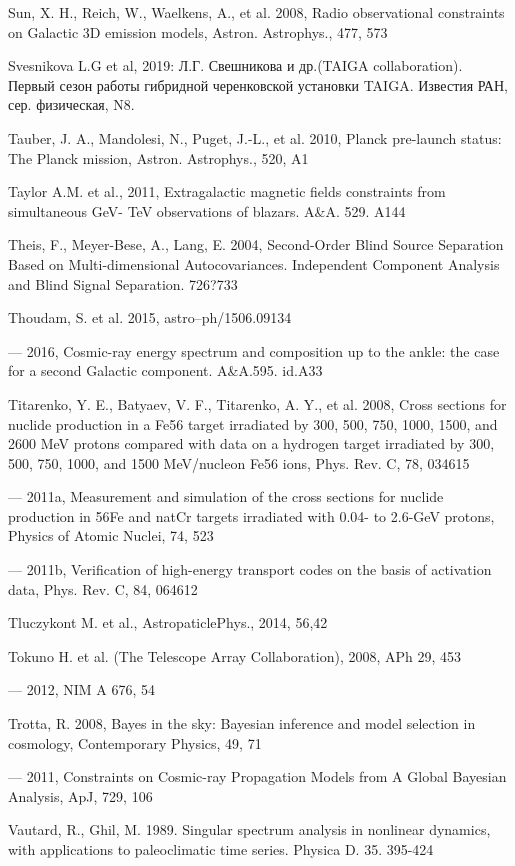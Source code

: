 Sun, X. H., Reich, W., Waelkens, A., et al. 2008, Radio observational constraints on Galactic 3D emission models, Astron. Astrophys., 477, 573

Svesnikova L.G et al, 2019: Л.Г. Свешникова и др.(TAIGA collaboration). Первый сезон работы гибридной черенковской установки  TAIGA. Известия РАН, сер. физическая, N8. 

Tauber, J. A., Mandolesi, N., Puget, J.-L., et al. 2010, Planck pre-launch status: The Planck mission, Astron. Astrophys., 520, A1

Taylor A.M. et al., 2011, Extragalactic magnetic fields constraints from simultaneous GeV- TeV observations of blazars. A\&A. 529. A144

Theis, F., Meyer-Bese, A., Lang, E. 2004, Second-Order Blind Source Separation Based on Multi-dimensional Autocovariances. Independent Component Analysis and Blind Signal Separation. 726?733

Thoudam, S. et al. 2015, astro--ph/1506.09134

--- 2016, Cosmic-ray energy spectrum and composition up to the ankle: the case for a second Galactic component. A\&A.595. id.A33

Titarenko, Y. E., Batyaev, V. F., Titarenko, A. Y., et al. 2008, Cross sections for nuclide production in a Fe56 target irradiated by 300, 500, 750, 1000, 1500, and 2600 MeV protons compared with data on a hydrogen target irradiated by 300, 500, 750, 1000, and 1500 MeV/nucleon Fe56 ions, Phys. Rev. C, 78, 034615

--- 2011a, Measurement and simulation of the cross sections for nuclide production in 56Fe and natCr targets irradiated with 0.04- to 2.6-GeV protons, Physics of Atomic Nuclei, 74, 523

--- 2011b, Verification of high-energy transport codes on the basis of activation data, Phys. Rev. C, 84, 064612

Tluczykont M. et al., AstropaticlePhys., 2014, 56,42

Tokuno H. et al. (The Telescope Array Collaboration), 2008, APh 29, 453

--- 2012, NIM A 676, 54

Trotta, R. 2008, Bayes in the sky: Bayesian inference and model selection in cosmology, Contemporary Physics, 49, 71

--- 2011, Constraints on Cosmic-ray Propagation Models from A Global Bayesian Analysis, ApJ, 729, 106

Vautard, R., Ghil, M. 1989. Singular spectrum analysis in nonlinear dynamics, with applications to paleoclimatic time series. Physica D. 35. 395-424

